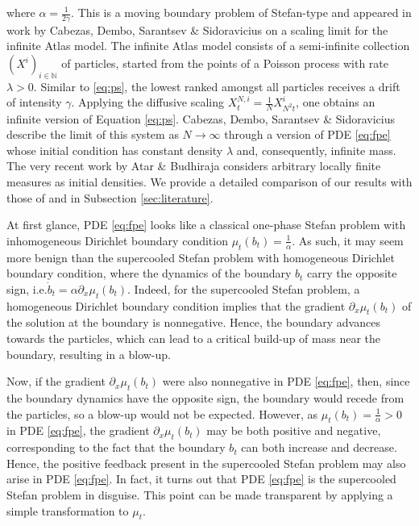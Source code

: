 \documentclass[11pt, a4paper]{article}
\theoremstyle{plain}
\theoremstyle{definition}
\theoremstyle{remark}
\numberwithin{equation}{section}
\newcommand{\bb}[1]{\mathbb{#1}}
\begin{document}
where $\alpha = \frac{1}{2 \gamma}$. This is a moving boundary problem of Stefan-type and appeared in work by Cabezas, Dembo, Sarantsev \& Sidoravicius \cite{cabezas_rank_2019} on a scaling limit for the infinite Atlas model. The infinite Atlas model consists of a semi-infinite collection $(X^i)_{i \in \bb{N}}$ of particles, started from the points of a Poisson process with rate $\lambda > 0$. Similar to \eqref{eq:ps}, the lowest ranked amongst all particles receives a drift of intensity $\gamma$. Applying the diffusive scaling $X^{N, i}_t = \frac{1}{N} X^i_{N^2 t}$, one obtains an infinite version of Equation \eqref{eq:ps}. Cabezas, Dembo, Sarantsev \& Sidoravicius \cite{cabezas_rank_2019} describe the limit of this system as $N \to \infty$ through a version of PDE \eqref{eq:fpe} whose initial condition has constant density $\lambda$ and, consequently, infinite mass. The very recent work by Atar \& Budhiraja \cite{atar_atlas_2025} considers arbitrary locally finite measures as initial densities. We provide a detailed comparison of our results with those of \cite{cabezas_rank_2019} and \cite{atar_atlas_2025} in Subsection \ref{sec:literature}.

At first glance, PDE \eqref{eq:fpe} looks like a classical one-phase Stefan problem with inhomogeneous Dirichlet boundary condition $\mu_t(b_t) = \frac{1}{\alpha}$.
As such, it may seem more benign than the supercooled Stefan problem with homogeneous Dirichlet boundary condition, where the dynamics of the boundary $b_t$ carry the opposite sign, i.e.\@ $\dot{b}_t = \alpha \partial_x \mu_t(b_t)$. Indeed, for the supercooled Stefan problem, a homogeneous Dirichlet boundary condition implies that the gradient $\partial_x \mu_t(b_t)$ of the solution at the boundary is nonnegative. Hence, the boundary advances towards the particles, which can lead to a critical build-up of mass near the boundary, resulting in a blow-up. 

Now, if the gradient $\partial_x \mu_t(b_t)$ were also nonnegative in PDE \eqref{eq:fpe}, then, since the boundary dynamics have the opposite sign, the boundary would recede from the particles, so a blow-up would not be expected. However, as $\mu_t(b_t) = \frac{1}{\alpha} > 0$ in PDE \eqref{eq:fpe}, the gradient $\partial_x \mu_t(b_t)$ may be both positive and negative, corresponding to the fact that the boundary $b_t$ can both increase and decrease. Hence, the positive feedback present in the supercooled Stefan problem may also arise in PDE \eqref{eq:fpe}. In fact, it turns out that PDE \eqref{eq:fpe} is the supercooled Stefan problem in disguise. This point can be made transparent by applying a simple transformation to $\mu_t$.
\end{document}
